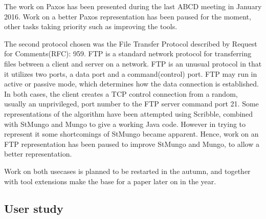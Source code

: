 The work on Paxos has been presented during the last ABCD meeting in January 2016. Work on a better Paxos representation has been paused for the moment, other tasks taking priority such as improving the tools.


The second protocol chosen was the File Transfer Protocol described by Request for Comments(RFC): 959\cite{FTP-rfc}. FTP is a standard network protocol for transferring  files between a client and server on a network.  FTP is an unusual protocol in that it utilizes two ports, a data port and a command(control) port. FTP may run in active or passive mode, which determines how the data connection is established. In both cases, the client creates a TCP control connection from a random, usually an unprivileged, port number to the FTP server command port 21.
%
%
Some representations of the algorithm have been attempted using Scribble, combined with StMungo and Mungo to give a working Java code. However in trying to represent it some shortcomings of StMungo became apparent. Hence, work on an FTP representation has been paused to improve StMungo and Mungo, to allow a better representation. 

Work on both usecases is planned to be restarted in the autumn, and together with tool extensions make the base for a paper later on in the year. 

\subsection{User study}
\label{us}




